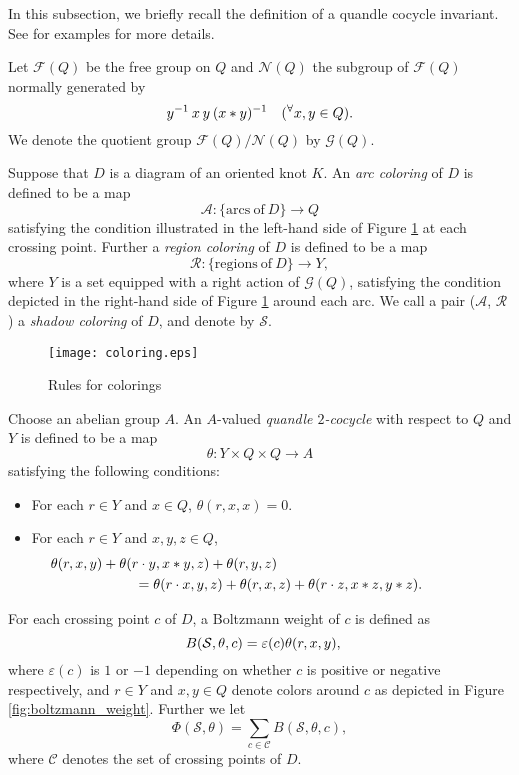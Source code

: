 \documentclass[12pt]{amsart}
\theoremstyle{definition}
\begin{document}
In this subsection, we briefly recall the definition of a quandle cocycle invariant.
See \cite{CEGS1, CJKLS1, FRS1, FRS2, Kamada1} for examples for more details.

Let $\mathcal{F}(Q)$ be the free group on $Q$ and $\mathcal{N}(Q)$ the subgroup of $\mathcal{F}(Q)$ normally generated by
\[
 y^{-1} \hskip 0.2em x \hskip 0.2em y \hskip 0.2em (x \ast y)^{-1} \quad ({}^{\forall}x, y \in Q).
\]
We denote the quotient group $\mathcal{F}(Q) / \mathcal{N}(Q)$ by $\mathcal{G}(Q)$.

Suppose that $D$ is a diagram of an oriented knot $K$.
An {\it arc coloring} of $D$ is defined to be a map
\[
 \mathcal{A} : \{ \mathrm{arcs} \ \mathrm{of} \ D \} \longrightarrow Q
\]
satisfying the condition illustrated in the left-hand side of Figure \ref{fig:coloring} at each crossing point.
Further a {\it region coloring} of $D$ is defined to be a map
\[
 \mathcal{R} : \{ \mathrm{regions} \ \mathrm{of} \ D \} \longrightarrow Y,
\]
where $Y$ is a set equipped with a right action of $\mathcal{G}(Q)$, satisfying the condition depicted in the right-hand side of Figure \ref{fig:coloring} around each arc.
We call a pair ($\mathcal{A}$, $\mathcal{R}$) a {\it shadow coloring} of $D$, and denote by $\mathcal{S}$.

\begin{figure}[htb]
\begin{center}
\texttt{[image: coloring.eps]}
\end{center}
\vspace{-7pt}
\caption{Rules for colorings}
\label{fig:coloring}
\end{figure}

Choose an abelian group $A$.
An $A$-valued {\it quandle $2$-cocycle} with respect to $Q$ and $Y$ is defined to be a map
\[
 \theta : Y \times Q \times Q \longrightarrow A
\]
satisfying the following conditions:
\begin{itemize}
\item[\hskip 0.1em($\mathrm{i}$)\hskip 0.2em] For each $r \in Y$ and $x \in Q$, $\theta(r, x, x) = 0$.
\item[($\mathrm{ii}$)] For each $r \in Y$ and $x, y, z \in Q$,
\begin{eqnarray*}
 & \hskip -5em \theta(r, x, y) + \theta(r \cdot y, x \ast y, z) + \theta(r, y, z) \\
 & \hskip 1em = \theta(r \cdot x, y, z) + \theta(r, x, z) + \theta(r \cdot z, x \ast z, y \ast z).
\end{eqnarray*}
\end{itemize}
For each crossing point $c$ of $D$, a Boltzmann weight of $c$ is defined as
\[
 \hskip 0.5em B(\mathcal{S}, \theta, c) = \varepsilon(c) \theta(r, x, y),
\]
where $\varepsilon(c)$ is $1$ or $-1$ depending on whether $c$ is positive or negative respectively, and $r \in Y$ and $x, y \in Q$ denote colors around $c$ as depicted in Figure \ref{fig:boltzmann_weight}.
Further we let
\[
 \Phi(\mathcal{S}, \theta) = \sum_{c \in \mathcal{C}} B(\mathcal{S}, \theta, c),
\]
where $\mathcal{C}$ denotes the set of crossing points of $D$.
\end{document}
